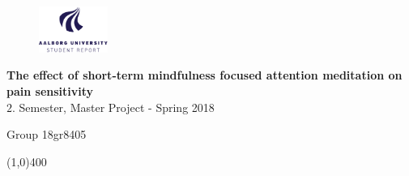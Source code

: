 \clearpage
\thispagestyle{empty}

\begin{figure}[H]
	\raggedleft
	\includegraphics[width=0.2\textwidth]{setup/aau_logo_en.pdf}
\end{figure} 

\vspace{5 cm}

\begin{center}	
	\begin{Huge}
		\textbf{The effect of short-term mindfulness focused attention meditation on pain sensitivity}\\
		\vspace{5 mm}
		$2.$ Semester, Master Project - Spring 2018\\
		\vspace{3 mm}
	\end{Huge}
	{\Large Group 18gr8405}
\end{center}
\vspace*{\fill}

\begin{center}
	\line(1,0){400}
\end{center}




